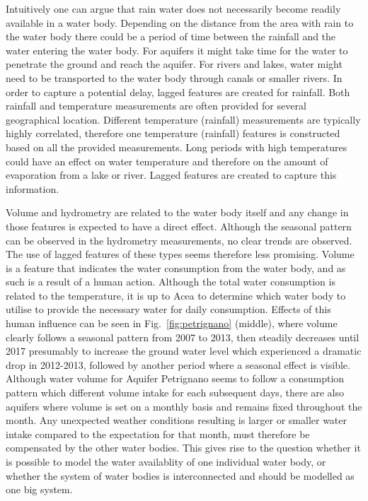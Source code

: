 \documentclass{article}
\begin{document}
Intuitively one can argue that rain water does not necessarily become readily available in a water body. Depending on the distance from the area with rain to the water body there could be a period of time between the rainfall and the water entering the water body. For aquifers it might take time for the water to penetrate the ground and reach the aquifer. For rivers and lakes, water might need to be transported to the water body through canals or smaller rivers. In order to capture a potential delay, lagged features are created for rainfall. Both rainfall and temperature measurements are often provided for several geographical location. Different temperature (rainfall) measurements are typically highly correlated, therefore one temperature (rainfall) features is constructed based on all the provided measurements. Long periods with high temperatures could have an effect on water temperature and therefore on the amount of evaporation from a lake or river. Lagged features are created to capture this information.

Volume and hydrometry are related to the water body itself and any change in those features is expected to have a direct effect. Although the seasonal pattern can be observed in the hydrometry measurements, no clear trends are observed. The use of lagged features of these types seems therefore less promising.  Volume is a feature that indicates the water consumption from the water body, and as such is a result of a human action. Although the total water consumption is related to the temperature, it is up to Acea to determine which water body to utilise to provide the necessary water for daily consumption. Effects of this human influence can be seen in Fig.~\ref{fig:petrignano} (middle), where volume clearly follows a seasonal pattern from 2007 to 2013, then steadily decreases until 2017 presumably to increase the ground water level which experienced a dramatic drop in 2012-2013, followed by another period where a seasonal effect is visible. Although water volume for Aquifer Petrignano seems to follow a consumption pattern  which different volume intake for each subsequent days, there are also aquifers where volume is set on a monthly basis and remains fixed throughout the month. Any unexpected weather conditions resulting is larger or smaller water intake compared to the expectation for that month, must therefore be compensated by the other water bodies. This gives rise to the question whether it is possible to model  the water availablity of one individual water body, or whether the system of water bodies is interconnected and should be modelled as one big system.
\end{document}
